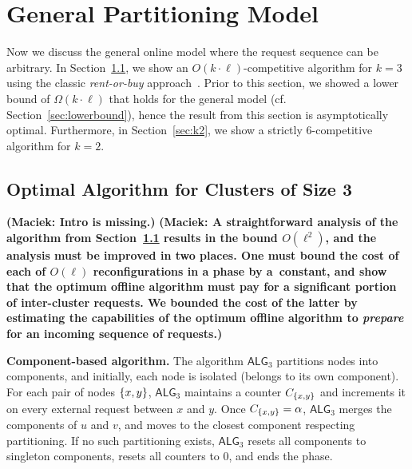 \documentclass[a4paper,anonymous,USenglish]{lipics-v2019}
\newcommand{\OPT}{\textsc{OPT}\xspace}
\newcommand{\OBRP}{BRP\xspace}
\newcommand{\TAlg}{{\ensuremath{\textsf{ALG}_{3}}}\xspace}
\DeclarePairedDelimiter\set{\{}{\}}
\newcommand\maciek[1]{\color{brown}\textbf{(Maciek: #1)}\color{black}}
\begin{document}

\section{General Partitioning Model}
\label{sec:part}

Now  we discuss the general online
model where the request sequence
can be arbitrary.
In Section~\ref{sec:k3}, we show an $O(k \cdot \ell)$-competitive algorithm for $k=3$ using the classic \emph{rent-or-buy} approach~\cite{karlin-ski-rental}.
Prior to this section, we showed a lower bound of $\Omega(k \cdot \ell)$  that holds for the general model (cf. Section~\ref{sec:lowerbound}), hence the result from this section is asymptotically optimal.
Furthermore, in Section~\ref{sec:k2}, we show a strictly $6$-competitive algorithm for $k=2$.



\subsection{Optimal Algorithm for Clusters of Size 3}
\label{sec:k3}

\maciek{Intro is missing.}
\maciek{
	A straightforward analysis of the algorithm from Section~\ref{sec:k3} results in the bound $O(\ell^2)$, and the analysis must be improved in two places. One must bound the cost of each of $O(\ell)$ reconfigurations in a phase by a~constant, and show that the optimum offline algorithm must pay for a significant portion of inter-cluster requests.
	We bounded the cost of the latter by estimating the capabilities of the optimum offline algorithm to \emph{prepare} for an incoming sequence of requests.}



\noindent
\textbf{Component-based algorithm.}
The algorithm \TAlg partitions nodes into components, and
initially, each node is isolated (belongs to its own component).
For each pair of nodes $\set{x,y}$, \TAlg maintains a counter $C_{\set{x,y}}$ and increments it on every external request between $x$ and $y$.
Once $C_{\set{x,y}} = \alpha$, \TAlg merges the components of $u$ and $v$, and moves to the closest component respecting partitioning.
If no such partitioning exists, \TAlg resets all components to singleton components, resets all counters to $0$, and ends the phase.
\end{document}
